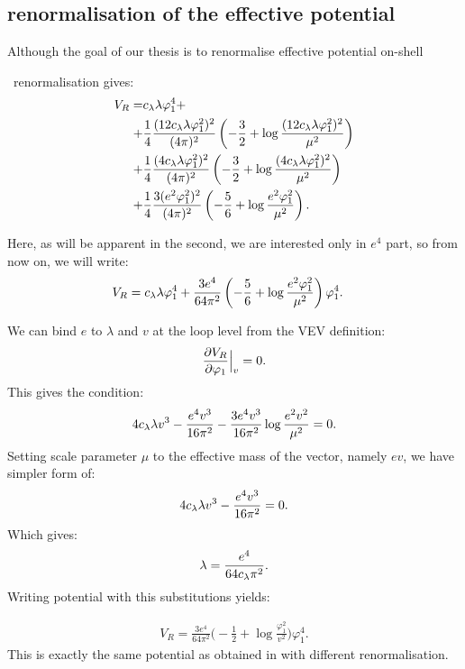 \subsection{\texorpdfstring{\MSbar}{MS-bar} renormalisation of the effective potential}
Although the goal of our thesis is to renormalise effective potential on-shell

\MSbar\ renormalisation gives:
\begin{align}
V_{R}=&c_\lambda\lambda\varphi_1^4 + \notag \\
+&\frac{1}{4}\frac{(12c_\lambda\lambda\varphi_1^2)^2}{(4\pi)^2}\left(-\frac{3}{2}+ 
\log{\frac{(12c_\lambda\lambda\varphi_1^2)^2}{\mu^2}}\right)\notag  \\
+&\frac{1}{4}\frac{(4c_\lambda\lambda\varphi_1^2)^2}{(4\pi)^2}\left(-\frac{3}{2}+ 
\log{\frac{(4c_\lambda\lambda\varphi_1^2)^2}{\mu^2}}\right) \notag \\
+&\frac{1}{4}\frac{3(e^2\varphi_1^2)^2}{(4\pi)^2}\left(-\frac{5}{6}+
\log{\frac{e^2\varphi_1^2}{\mu^2}}\right).
\end{align}

Here, as will be apparent in the second, we are interested only in $e^4$ part, so from now on, 
we will write:
\begin{align}
V_{R}=c_\lambda\lambda\varphi_1^4 + \frac{3e^4}{64\pi^2}&\left(-\frac{5}{6}+
\log{\frac{e^2\varphi_1^2}{\mu^2}}\right)\varphi_1^4.
\end{align}

We can bind $e$ to $\lambda$ and $v$ at the loop level from the VEV definition:
\begin{align}
\frac{\partial V_R}{\partial \varphi_1} \Big|_v= 0.
\end{align}
This gives the condition:
\begin{align}
4c_\lambda\lambda v^3-\frac{e^4v^3}{16\pi^2}-\frac{3e^4v^3}{16\pi^2}\log\frac{e^2v^2}{\mu^2}=0.
\end{align}
Setting scale parameter $\mu$ to the effective mass of the vector, namely $ev$, we have 
simpler form of:
\begin{align}
4c_\lambda\lambda v^3-\frac{e^4v^3}{16\pi^2}=0.
\end{align}
Which gives:
\begin{align}\label{e4_lambda_MS}
\lambda = \frac{e^4}{64c_\lambda\pi^2}.
\end{align}
Writing potential with this substitutions yields:

\begin{align}\label{MSbar_result}
V_R = \frac{3e^4}{64\pi^2}\Big(-\frac{1}{2}+\log\frac{\varphi_1^2}{v^2}\Big)\varphi_1^4.
\end{align}
This is exactly the same potential as obtained in \cite{Coleman1973} with different renormalisation.

